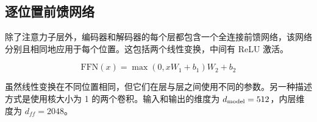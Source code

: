 \subsection{逐位置前馈网络}\label{sec:ffn}

除了注意力子层外，编码器和解码器的每个层都包含一个全连接前馈网络，该网络分别且相同地应用于每个位置。这包括两个线性变换，中间有 ReLU 激活。

\begin{equation}
   \mathrm{FFN}(x)=\max(0, xW_1 + b_1) W_2 + b_2
\end{equation}

虽然线性变换在不同位置相同，但它们在层与层之间使用不同的参数。另一种描述方式是使用核大小为 1 的两个卷积。输入和输出的维度为 $d_{\text{model}}=512$，内层维度为 $d_{ff}=2048$。





